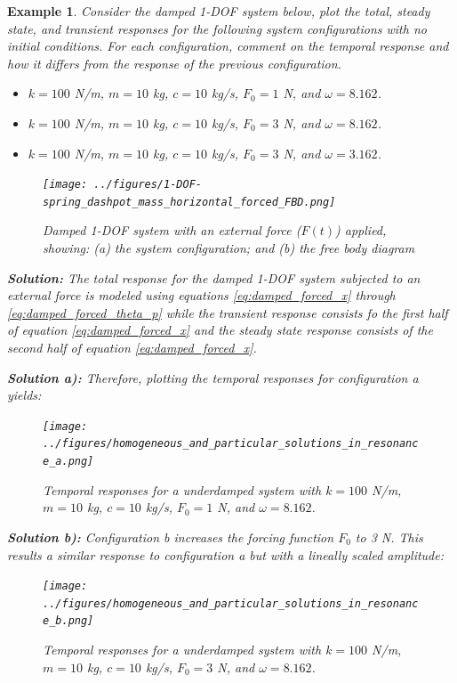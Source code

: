 \documentclass[12pt,letter]{article}
\newtheorem{ex}{Example}
\numberwithin{ex}{section} %
\newenvironment{example}{\begin{mdframed}[middlelinewidth=0.5mm]\begin{ex}\normalfont}{\end{ex}\end{mdframed}}
\numberwithin{re}{section} %
\begin{document}
			\begin{example}
			\label{ex:homogeneous_and_particular_solutions_in_resonance}		
				Consider the damped 1-DOF system below, plot the total, steady state, and transient responses for the following system configurations with no initial conditions. For each configuration, comment on the temporal response and how it differs from the response of the previous configuration.    
				
				\begin{itemize}
				\item[a)] $k=100$ N/m, $m=10$ kg,  $c=10$ kg/s, $F_0=1$ N, and $\omega = 8.162$.
				\item[b)] $k=100$ N/m, $m=10$ kg,  $c=10$ kg/s, $F_0=3$ N, and $\omega = 8.162$.
				\item[c)] $k=100$ N/m, $m=10$ kg,  $c=10$ kg/s, $F_0=3$ N, and $\omega = 3.162$.
				\end{itemize}
				
				\begin{figure}[H]
					\centering
					\texttt{[image: ../figures/1-DOF-spring\_dashpot\_mass\_horizontal\_forced\_FBD.png]}
					\caption{Damped 1-DOF system with an external force ($F(t)$) applied, showing: (a) the system configuration; and (b) the free body diagram}
				\end{figure}
				
				\noindent\textbf{Solution:} The total response for the damped 1-DOF system subjected to an external force is modeled using equations \ref{eq:damped_forced_x} through \ref{eq:damped_forced_theta_p} while the transient response consists fo the first half of equation \ref{eq:damped_forced_x} and the steady state response consists of the second half of equation \ref{eq:damped_forced_x}.  
				
				
				\noindent\textbf{Solution a):} Therefore, plotting the temporal responses for configuration a yields:
				\begin{figure}[H]
					\centering
					\texttt{[image: ../figures/homogeneous\_and\_particular\_solutions\_in\_resonance\_a.png]}
					\caption{Temporal responses for a underdamped system with $k=100$ N/m, $m=10$ kg,  $c=10$ kg/s, $F_0=1$ N, and $\omega = 8.162$.}
				\end{figure}			
				 
				\noindent\textbf{Solution b):} Configuration b increases the forcing function $F_0$ to 3 N. This results a similar response to configuration a but with a lineally scaled amplitude:
				\begin{figure}[H]
					\centering
					\texttt{[image: ../figures/homogeneous\_and\_particular\_solutions\_in\_resonance\_b.png]}
					\caption{Temporal responses for a underdamped system with $k=100$ N/m, $m=10$ kg,  $c=10$ kg/s, $F_0=3$ N, and $\omega = 8.162$.}
				\end{figure}			
				

\end{example}
\end{document}
